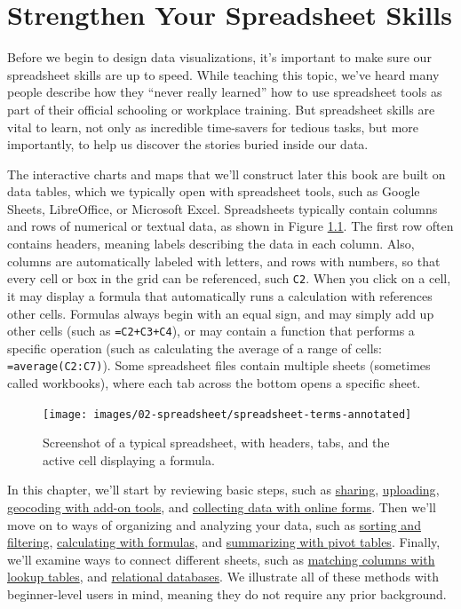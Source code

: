 \documentclass[
  english,
]{book}
\begin{document}
\hypertarget{spreadsheet}{%
\chapter{Strengthen Your Spreadsheet Skills}\label{spreadsheet}}

Before we begin to design data visualizations, it's important to make sure our spreadsheet skills are up to speed. While teaching this topic, we've heard many people describe how they ``never really learned'' how to use spreadsheet tools as part of their official schooling or workplace training. But spreadsheet skills are vital to learn, not only as incredible time-savers for tedious tasks, but more importantly, to help us discover the stories buried inside our data.

The interactive charts and maps that we'll construct later this book are built on data tables, which we typically open with spreadsheet tools, such as Google Sheets, LibreOffice, or Microsoft Excel. Spreadsheets typically contain columns and rows of numerical or textual data, as shown in Figure \ref{fig:spreadsheet-terms}. The first row often contains headers, meaning labels describing the data in each column. Also, columns are automatically labeled with letters, and rows with numbers, so that every cell or box in the grid can be referenced, such \texttt{C2}. When you click on a cell, it may display a formula that automatically runs a calculation with references other cells. Formulas always begin with an equal sign, and may simply add up other cells (such as \texttt{=C2+C3+C4}), or may contain a function that performs a specific operation (such as calculating the average of a range of cells: \texttt{=average(C2:C7)}). Some spreadsheet files contain multiple sheets (sometimes called workbooks), where each tab across the bottom opens a specific sheet.



\begin{figure}
\texttt{[image: images/02-spreadsheet/spreadsheet-terms-annotated]} \caption{Screenshot of a typical spreadsheet, with headers, tabs, and the active cell displaying a formula.}\label{fig:spreadsheet-terms}
\end{figure}

In this chapter, we'll start by reviewing basic steps, such as \href{share.html}{sharing}, \href{upload.html}{uploading}, \href{geocode.html}{geocoding with add-on tools}, and \href{forms.html}{collecting data with online forms}. Then we'll move on to ways of organizing and analyzing your data, such as \href{sort.html}{sorting and filtering}, \href{calculate.html}{calculating with formulas}, and \href{pivot.html}{summarizing with pivot tables}. Finally, we'll examine ways to connect different sheets, such as \href{vlookup.html}{matching columns with lookup tables}, and \href{database.html}{relational databases}. We illustrate all of these methods with beginner-level users in mind, meaning they do not require any prior background.
\end{document}
